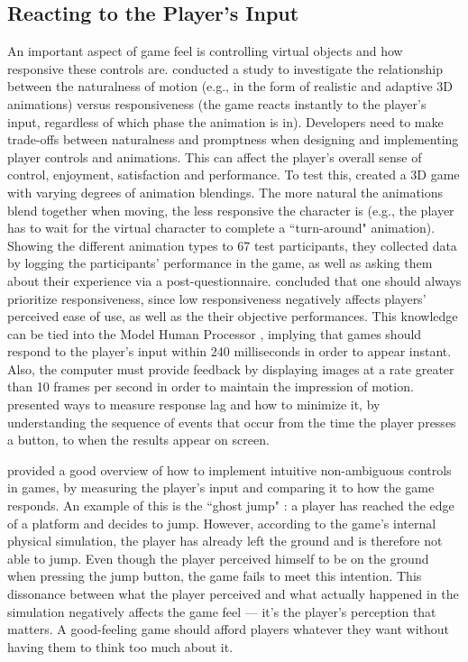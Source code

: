 \subsection{Reacting to the Player's Input}
An important aspect of game feel is controlling virtual objects and how responsive these controls are. \cite{normoyle_trade-offs_2014} conducted a study to investigate the relationship between the naturalness of motion (e.g., in the form of realistic and adaptive 3D animations) versus responsiveness (the game reacts instantly to the player's input, regardless of which phase the animation is in). Developers need to make trade-offs between naturalness and promptness when designing and implementing player controls and animations. This can affect the player's overall sense of control, enjoyment, satisfaction and performance. To test this, \cite{normoyle_trade-offs_2014} created a 3D game with varying degrees of animation blendings. The more natural the animations blend together when moving, the less responsive the character is (e.g., the player has to wait for the virtual character to complete a ``turn-around" animation). Showing the different animation types to 67 test participants, they collected data by logging the participants' performance in the game, as well as asking them about their experience via a post-questionnaire. \cite{normoyle_trade-offs_2014} concluded that one should always prioritize responsiveness, since low responsiveness negatively affects players' perceived ease of use, as well as the their objective performances. This knowledge can be tied into the Model Human Processor \cite{card1986model}, implying that games should respond to the player's input within 240 milliseconds in order to appear instant. Also, the computer must provide feedback by displaying images at a rate greater than 10 frames per second in order to maintain the impression of motion. \cite{measure_lag, program_lag} presented ways to measure response lag and how to minimize it, by understanding the sequence of events that occur from the time the player presses a button, to when the results appear on screen.

\cite{intuitive_buttons} provided a good overview of how to implement intuitive non-ambiguous controls in games, by measuring the player's input and comparing it to how the game  responds. An example of this is the ``ghost jump" \cite{ghostJump, canabalt}: a player has reached the edge of a platform and decides to jump. However, according to the game's internal physical simulation, the player has already left the ground and is therefore not able to jump. Even though the player perceived himself to be on the ground when pressing the jump button, the game fails to meet this intention. This dissonance between what the player perceived and what actually happened in the simulation negatively affects the game feel --- it's the player's perception that matters. A good-feeling game should afford players whatever they want without having them to think too much about it.

